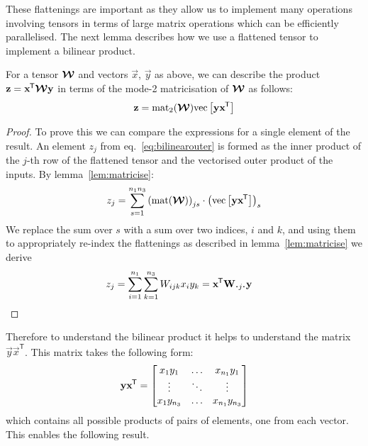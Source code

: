 These flattenings are important as they allow us to
implement many operations involving tensors in terms of large matrix operations which can be efficiently
parallelised. The next lemma describes how we use a flattened tensor to implement a bilinear product.

\begin{lem}\label{lem:outerprod}
For a tensor \(\bm{\mathcal{W}}\) and vectors \(\vec{x}\), \(\vec{y}\) as above,
we can describe the product \(\mathbf{z} = \mathbf{x}^{\mkern-1.5mu\mathsf{T}}\bm{\mathcal{W}}\mathbf{y}\) in terms of the
mode-2 matricisation of \(\bm{\mathcal{W}}\) as 
follows:
\begin{align}
	\mathbf{z} = \operatorname{mat}_2(\bm{\mathcal{W}})\mathrm{vec}\left[\mathbf{y}\mathbf{x}^{\mkern-1.5mu\mathsf{T}}\right]
	\label{eq:bilinearouter}
\end{align}
\end{lem}

\begin{proof}
To
prove this we can compare the expressions for a single element of the result.
An element \(z_j\) from eq.~\eqref{eq:bilinearouter}
is formed as the inner product of the \(j\)-th
row of the flattened tensor and the vectorised outer product of the inputs. By 
lemma~\ref{lem:matricise}:
\begin{equation}
	z_j = 
	\sum_{s=1}^{n_1n_3} \left(\operatorname{mat}(\bm{\mathcal{W}})\right)_{js} \cdot
	\left( \operatorname{vec}\left[\mathbf{y}\mathbf{x}^{\mkern-1.5mu\mathsf{T}}\right]\right)_s
\end{equation}
We replace the sum over \(s\) with a sum over two
indices, \(i\) and \(k\), and using them to appropriately re-index the flattenings 
as described in lemma~\ref{lem:matricise} we 
derive
\begin{align}
	z_j &= \sum_{i=1}^{n_1}\sum_{k=1}^{n_3} W_{ijk} x_i y_k 
		= \tran{\vec{x}}\mat{W}_{\midbullet j \midbullet}\vec{y}
\end{align}

\end{proof}


Therefore to understand the bilinear product it helps to understand the matrix 
\(\vec{y}\vec{x}^\mathsf{T}\). This matrix takes the following form:
\begin{equation}\label{eq:outer}
	\mathbf{y}\mathbf{x}^{\mkern-1.5mu\mathsf{T}} = \begin{bmatrix}
		x_1y_1 & \ldots & x_{n_1}y_1 \\
		\vdots & \ddots & \vdots \\
		x_1y_{n_3} & \ldots & x_{n_1}y_{n_3}
	\end{bmatrix}
\end{equation} which contains all possible products of pairs of elements, one from each vector. 
This enables the following result.


